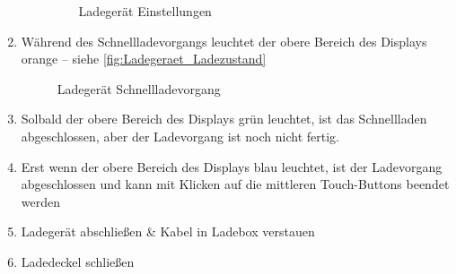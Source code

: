 \begin{enumerate}
\begin{enumerate}
        \begin{figure}[H]
            \centering
            \caption{Ladegerät Einstellungen \label{fig:Ladegeraet_Menueanzeige2}}
        \end{figure}
    \end{enumerate}
    \newpage
    \item Während des Schnellladevorgangs leuchtet der obere Bereich des Displays orange -- siehe \autoref{fig:Ladegeraet_Ladezustand}
    \begin{figure}[H]
        \centering
        \caption{Ladegerät Schnellladevorgang \label{fig:Ladegeraet_Ladezustand}}
    \end{figure}
    \item Solbald der obere Bereich des Displays grün leuchtet, ist das Schnellladen abgeschlossen, aber der Ladevorgang ist noch nicht fertig.
    \item Erst wenn der obere Bereich des Displays blau leuchtet, ist der Ladevorgang abgeschlossen und kann mit Klicken auf die mittleren Touch-Buttons beendet werden
    \item Ladegerät abschließen \& Kabel in Ladebox verstauen
    \item Ladedeckel schließen
\end{enumerate}
